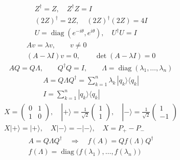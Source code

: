 \documentclass{article}
\begin{document}
\newpage
\null\vfill\[\begin{gathered}
Z^\dagger=Z,\quad Z^\dagger Z=I\\[10pt](2Z)^\dagger=2Z,\quad (2Z)^\dagger(2Z)=4I\\[10pt]U=\operatorname{diag}(e^{-i\theta},e^{i\theta}),\quad U^\dagger U=I
\end{gathered}\]\vfill\null
\newpage
\null\vfill\[\begin{gathered}
Av=\lambda v,\qquad v\neq0\\[12pt](A-\lambda I)v=0,\qquad \det(A-\lambda I)=0
\end{gathered}\]\vfill\null
\newpage
\null\vfill\[\begin{gathered}
AQ=Q\Lambda,\qquad Q^\dagger Q=I,\qquad \Lambda=\operatorname{diag}(\lambda_1,\ldots,\lambda_n)
\end{gathered}\]\vfill\null
\newpage
\null\vfill\[\begin{gathered}
A=Q\Lambda Q^\dagger=\sum_{k=1}^{n}\lambda_k\,|q_k\rangle\langle q_k|\\[12pt]I=\sum_{k=1}^{n}|q_k\rangle\langle q_k|
\end{gathered}\]\vfill\null
\newpage
\null\vfill\[\begin{gathered}
X=\begin{pmatrix}0&1\\1&0\end{pmatrix},\quad |+\rangle=\frac1{\sqrt2}\begin{pmatrix}1\\1\end{pmatrix},\quad |-\rangle=\frac1{\sqrt2}\begin{pmatrix}1\\-1\end{pmatrix}\\[12pt]X|+\rangle=|+\rangle,\quad X|-\rangle=-|-\rangle,\quad X=P_+-P_-
\end{gathered}\]\vfill\null
\newpage
\null\vfill\[\begin{gathered}
A=Q\Lambda Q^\dagger\quad\Longrightarrow\quad f(A)=Qf(\Lambda)Q^\dagger\\[12pt]f(\Lambda)=\operatorname{diag}\bigl(f(\lambda_1),\ldots,f(\lambda_n)\bigr)
\end{gathered}\]\vfill\null
\newpage
\end{document}
